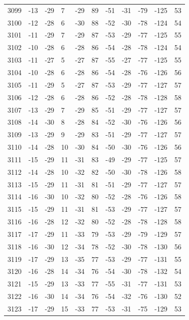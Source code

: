 \begin{table}[H]
\begin{tabular}{lllllllllll}
3099 & -13 & -29 & 7 & -29 & 89 & -51 & -31 & -79 & -125 & 53 \\
3100 & -12 & -28 & 6 & -30 & 88 & -52 & -30 & -78 & -124 & 54 \\
3101 & -11 & -29 & 7 & -29 & 87 & -53 & -29 & -77 & -125 & 55 \\
3102 & -10 & -28 & 6 & -28 & 86 & -54 & -28 & -78 & -124 & 54 \\
3103 & -11 & -27 & 5 & -27 & 87 & -55 & -27 & -77 & -125 & 55 \\
3104 & -10 & -28 & 6 & -28 & 86 & -54 & -28 & -76 & -126 & 56 \\
3105 & -11 & -29 & 5 & -27 & 87 & -53 & -29 & -77 & -127 & 57 \\
3106 & -12 & -28 & 6 & -28 & 86 & -52 & -28 & -78 & -128 & 58 \\
3107 & -13 & -29 & 7 & -29 & 85 & -51 & -29 & -77 & -127 & 57 \\
3108 & -14 & -30 & 8 & -28 & 84 & -52 & -30 & -76 & -126 & 56 \\
3109 & -13 & -29 & 9 & -29 & 83 & -51 & -29 & -77 & -127 & 57 \\
3110 & -14 & -28 & 10 & -30 & 84 & -50 & -30 & -76 & -126 & 56 \\
3111 & -15 & -29 & 11 & -31 & 83 & -49 & -29 & -77 & -125 & 57 \\
3112 & -14 & -28 & 10 & -32 & 82 & -50 & -30 & -78 & -126 & 58 \\
3113 & -15 & -29 & 11 & -31 & 81 & -51 & -29 & -77 & -127 & 57 \\
3114 & -16 & -30 & 10 & -32 & 80 & -52 & -28 & -76 & -126 & 58 \\
3115 & -15 & -29 & 11 & -31 & 81 & -53 & -29 & -77 & -127 & 57 \\
3116 & -16 & -28 & 12 & -32 & 80 & -52 & -28 & -78 & -128 & 58 \\
3117 & -17 & -29 & 11 & -33 & 79 & -53 & -29 & -79 & -129 & 57 \\
3118 & -16 & -30 & 12 & -34 & 78 & -52 & -30 & -78 & -130 & 56 \\
3119 & -17 & -29 & 13 & -35 & 77 & -53 & -29 & -77 & -131 & 55 \\
3120 & -16 & -28 & 14 & -34 & 76 & -54 & -30 & -78 & -132 & 54 \\
3121 & -15 & -29 & 13 & -33 & 77 & -55 & -31 & -77 & -131 & 53 \\
3122 & -16 & -30 & 14 & -34 & 76 & -54 & -32 & -76 & -130 & 52 \\
3123 & -17 & -29 & 15 & -33 & 77 & -53 & -31 & -75 & -129 & 53 \\

\end{tabular}
\end{table}

